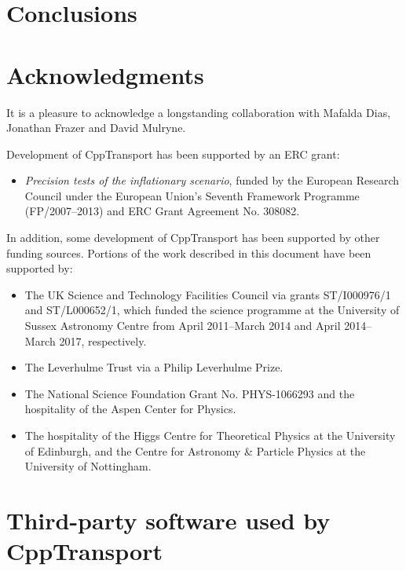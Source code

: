 \documentclass[11pt,a4paper]{article}
\newcommand{\packagefont}{\sffamily}
\newcommand{\CppTransport}{{\packagefont CppTransport}}
\begin{document}
\section{Conclusions} 

\section{Acknowledgments}
It is a pleasure to acknowledge a longstanding collaboration
with
Mafalda Dias,
Jonathan Frazer
and David Mulryne.

Development of {\CppTransport} has been supported
by an ERC grant:
\begin{itemize}
    \item \emph{Precision tests of the inflationary
    scenario},
    funded by
    the European Research Council under the European Union's
    Seventh Framework Programme (FP/2007--2013) and ERC Grant Agreement No. 308082.
\end{itemize}
In addition,
some development of {\CppTransport} has been supported by
other funding sources.
Portions of
the work described in this document have been supported by:
\begin{itemize}
    \item The UK
    Science and Technology Facilities Council via grants
    ST/I000976/1 and ST/L000652/1,
    which funded the science programme at the University of Sussex Astronomy
    Centre from April 2011--March 2014
    and April 2014--March 2017, respectively.
    \item The Leverhulme Trust via a Philip Leverhulme Prize.
    \item The National Science Foundation Grant No. PHYS-1066293
    and the hospitality of the Aspen Center for Physics.
    \item The hospitality of the Higgs Centre for Theoretical
    Physics at the University of Edinburgh,
    and the Centre for Astronomy \& Particle Physics
    at the University of Nottingham.
\end{itemize}

\appendix

\section{Third-party software used by {\CppTransport}}



\end{document}

